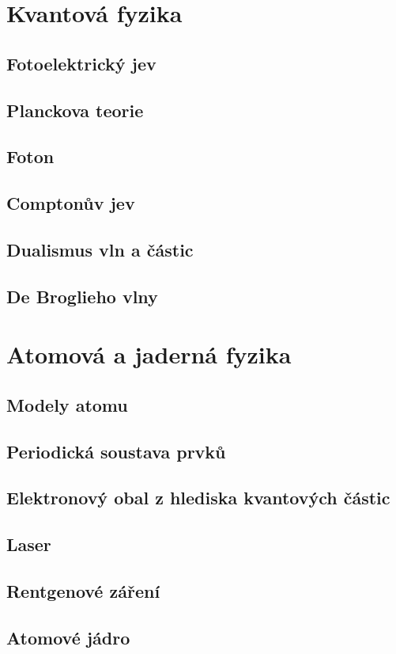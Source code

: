 \documentclass[titlepage]{book}
\begin{document}
\chapter{Kvantová fyzika}
\section{Fotoelektrický jev}
\section{Planckova teorie}
\section{Foton}
\section{Comptonův jev}
\section{Dualismus vln a částic}
\section{De Broglieho vlny}
\chapter{Atomová a jaderná fyzika}
\section{Modely atomu}
\section{Periodická soustava prvků}
\section{Elektronový obal z hlediska kvantových částic}
\section{Laser}
\section{Rentgenové záření}
\section{Atomové jádro}
\end{document}
